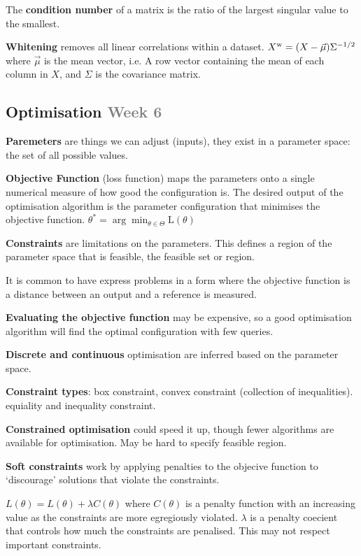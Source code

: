 \documentclass{article}
\begin{document}
The \textbf{condition number} of a matrix is the ratio of the largest singular value to the smallest.

\textbf{Whitening} removes all linear correlations within a dataset.
$X^{\text w} = (X - \vec{\mu}) \Sigma^{-1/2}$ where $\vec{\mu}$ is the mean vector, i.e.
A row vector containing the mean of each column in $X$, and $\Sigma$ is the covariance matrix.

\clearpage

\subsection*{Optimisation \small\textcolor{gray}{Week 6}}

\textbf{Paremeters} are things we can adjust (inputs), they exist in a parameter space: the set of all possible values.

\textbf{Objective Function} (loss function) maps the parameters onto a single numerical measure of how good the configuration is.
The desired output of the optimisation algorithm is the parameter configuration that minimises the objective function.
$\theta^* = \arg \min_{\theta \in \Theta} \text{L}(\theta)$

\textbf{Constraints} are limitations on the parameters. This defines a region of the parameter space that is feasible,
the feasible set or region.

It is common to have express problems in a form where the objective function is a distance between an output
and a reference is measured.

\textbf{Evaluating the objective function} may be expensive, so a good optimisation algorithm will find the optimal
configuration with few queries.

\textbf{Discrete and continuous} optimisation are inferred based on the parameter space.

\textbf{Constraint types}: box constraint, convex constraint (collection of inequalities).
equiality and inequality constraint.

\textbf{Constrained optimisation} could speed it up, though fewer algorithms are available for optimisation.
May be hard to specify feasible region.

\textbf{Soft constraints} work by applying penalties to the objecive function to `discourage' solutions that violate the constraints.

$ L(\theta) = L(\theta) + \lambda C(\theta) $ where $C(\theta)$ is a penalty function with an increasing value as the
constraints are more egregiously violated. $\lambda$ is a penalty coecient that controls how much the constraints are penalised.
This may not respect important constraints.
\end{document}
